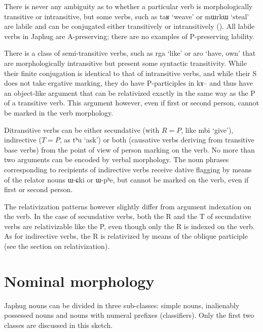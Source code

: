 \documentclass[oldfontcommands,oneside,a4paper,11pt]{article}
\newcommand{\ipa}[1]{{\phon #1}} %
\begin{document}
There is never any ambiguity as to whether a particular verb is morphologically  transitive or intransitive, but some verbs, such as \ipa{taʁ} `weave' or \ipa{mɯrkɯ} `steal' are labile and can be conjugated either transitively or intransitively (\citealt{jacques12demotion}). All labile verbs in Japhug are A-preserving; there are no examples of P-preserving lability.

There is a class of semi-transitive verbs, such as \ipa{rga} `like' or \ipa{aro} `have, own' that are morphologically intransitive but present some syntactic transitivity. While their finite conjugation is identical to that of intransitive verbs, and while their S does not take ergative marking, they do have P-participles in \ipa{kɤ--} and thus have an object-like argument that can be relativized exactly in the same way as the P of a transitive verb. This argument however, even if first or second person, cannot be marked in the verb morphology.

Ditransitive verbs can be either secundative (with $R=P$, like \ipa{mbi} `give'), indirective ($T=P$, as \ipa{tʰu} `ask') or both (causative verbs deriving from transitive base verbs) from the point of view of person marking on the verb. No more than two arguments can be encoded by verbal morphology. The noun phrases corresponding to recipients of indirective verbs receive dative flagging by means of the relator nouns \ipa{ɯ-ɕki} or \ipa{ɯ-pʰe}, but cannot be marked on the verb, even if first or second person.

The relativization patterns however slightly differ from argument indexation on the verb.
In the case of secundative verbs, both the R and the T of secundative verbs are relativizable like the P, even though only the R is indexed on the verb. As for indirective verbs, the R is relativized by means of the oblique participle (see the section on relativization).

\section{Nominal morphology}
Japhug nouns can be divided in three sub-classes: simple nouns, inalienably possessed nouns and nouns with numeral prefixes (classifiers). Only the first two classes are discussed in this sketch. 
\end{document}
